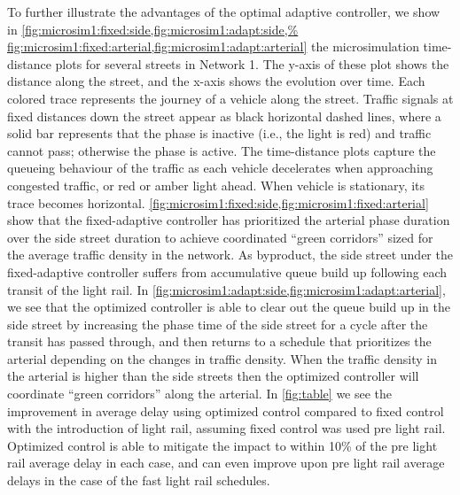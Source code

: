 To further illustrate the advantages of the optimal adaptive controller, we show
in \cref{fig:microsim1:fixed:side,fig:microsim1:adapt:side,%
fig:microsim1:fixed:arterial,fig:microsim1:adapt:arterial} the microsimulation
time-distance plots for several streets in Network 1.
%
The y-axis of these plot shows the distance along the street, and the x-axis
shows the evolution over time.
%
Each colored trace represents the journey of a vehicle along the street.
%
Traffic signals at fixed distances down the street appear as black horizontal
dashed lines, where a solid bar represents that the phase is inactive (i.e., the
light is red) and traffic cannot pass; otherwise the phase is active.
%
%
The time-distance plots capture the queueing behaviour of the traffic as each
vehicle decelerates when approaching congested traffic, or red or amber light
ahead.
%
When vehicle is stationary, its trace becomes horizontal.
%
\cref{fig:microsim1:fixed:side,fig:microsim1:fixed:arterial} show that the
fixed-adaptive controller has prioritized the arterial phase duration over the
side street duration to achieve coordinated ``green corridors'' sized for the
average traffic density in the network.
%
As byproduct, the side street under the fixed-adaptive controller suffers from
accumulative queue build up following each transit of the light rail.
%
In \cref{fig:microsim1:adapt:side,fig:microsim1:adapt:arterial}, we see that the
optimized controller is able to clear out the queue build up in the side street
by increasing the phase time of the side street for a cycle after the transit
has passed through, and then returns to a schedule that prioritizes the arterial
depending on the changes in traffic density.
%
When the traffic density in the arterial is higher than the side streets then
the optimized controller will coordinate ``green corridors'' along the
arterial.
%
In \cref{fig:table} we see the improvement in average delay using optimized control compared to fixed control with the introduction
 of light rail, assuming fixed control was used pre light rail. Optimized control is
 able to mitigate the impact to within 10\% of the pre light rail average delay in each case, and can even
 improve upon pre light rail average delays in the case of the fast light rail schedules.


